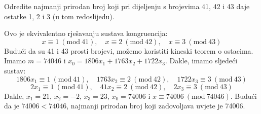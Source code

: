 \documentclass{exam}
\newcommand{\Mod}[1]{\ (\mathrm{mod}\ #1)}
\begin{document}
\begin{questions}
\begin{solution}
\end{solution}

\question Odredite najmanji prirodan broj koji pri dijeljenju s brojevima 41, 42 i 43 daje ostatke 1, 2 i 3 (u tom redoslijedu).

\begin{solution}
  Ovo je ekvivalentno rješavanju sustava kongruencija:
  \[
    x \equiv 1 \Mod{41}, \quad x \equiv 2 \Mod{42}, \quad x \equiv 3 \Mod{43}
  \]
  Budući da su 41 i 43 prosti brojevi, možemo koristiti kineski teorem o ostacima. Imamo $m = 74046$ i $x_0 = 1806x_1 + 1763x_2 + 1722x_3$. Dakle, imamo sljedeći sustav:
  \[
    1806x_1 \equiv 1 \Mod{41}, \quad 1763x_2 \equiv 2 \Mod{42}, \quad 1722x_3 \equiv 3 \Mod{43}
  \]
  \[
    2x_1 \equiv 1 \Mod{41}, \quad 41x_2 \equiv 2 \Mod{42}, \quad 2x_3 \equiv 3 \Mod{43}
  \]
  Dakle, $x_1 = 21$, $x_2 = -2$, $x_3 = 23$, $x_0 = 74006$ i $x \equiv 74006 \Mod{74046}$. Budući da je $74006 < 74046$, najmanji prirodan broj koji zadovoljava uvjete je 74006.
\end{solution}


\end{questions}
\end{document}
